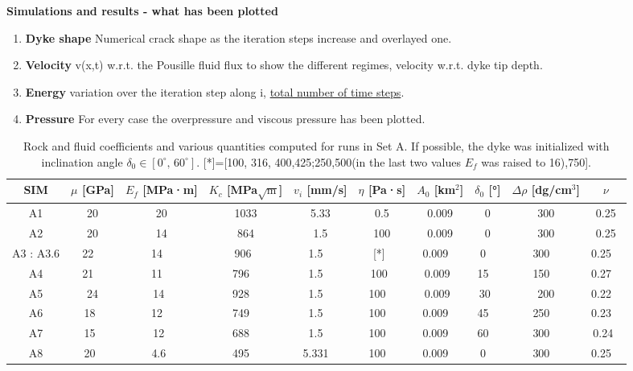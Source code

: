 \documentclass[9pt]{beamer}
\newcommand\Fontsm{\fontsize{4}{5}\selectfont}
\newcommand\Fonttab{\fontsize{12}{7.2}\selectfont}
\begin{document}
\begin{frame}[allowframebreaks]{\textbf{Simulations and results - what has been plotted}}
\Fonttab
\begin{enumerate}
\item \textbf{Dyke shape} Numerical crack shape as the iteration steps increase and overlayed one.
\item \textbf{Velocity} v(x,t) w.r.t. the Pousille fluid flux to show the different regimes, velocity w.r.t. dyke tip depth.
\item \textbf{Energy} variation over the iteration step along i, \underline{total number of time steps}.
\item \textbf{Pressure} For every case the overpressure and viscous pressure has been plotted.
\end{enumerate}
\Fontsm
\begin{table}[h]
    \centering
    \begin{tabular}{|c|c|c|c|c|c|c|c|c|c|}
    \hline
        \textbf{SIM} & \textbf{$\mu$ [GPa]} & \textbf{$E_f$ [MPa·m]} & \textbf{$K_c$ [MPa$\sqrt{\text{m}}$]} & \textbf{$v_i$ [mm/s]} & \textbf{$\eta$ [Pa·s]} & \textbf{$A_0$ [km$^2$]} & \textbf{$\delta_0$ [°]} & \textbf{$\Delta \rho$ [dg/cm$^3$]} & \textbf{$\nu$} \\
    \hline
        A1 &20 &20 &1033 &5.33 &0.5 &0.009 & 0 &300 & 0.25 \\ \hline
        A2 &20 &14 &864  &1.5  &100 &0.009 & 0 &300 & 0.25 \\ \hline
        A3 : A3.6 &22 ~ &14 ~ & 906~ &1.5 ~ & [*]~ &0.009 ~ &0 ~ &300 ~ &0.25 ~ \\ \hline
        A4 &21 ~ &11 ~ &796 ~ &1.5 ~ & 100~ & 0.009~ &15 ~ &150 ~ &0.27 ~ \\ \hline
        A5 &24 &14~ &928 ~ &1.5 ~ &100 ~ &0.009~ &30~ &200&0.22 ~ \\ \hline
        A6 &18~ &12 ~ &749 ~ &1.5 ~ &100 ~ &0.009 ~ &45 ~ &250 ~ &0.23 ~ \\ \hline
        A7 &15~ &12~ &688 ~ &1.5 ~ &100 ~ &0.009 ~ &60 ~ &300 ~ & 0.24~ \\ \hline
        A8 &20~ &4.6~ &495 ~ &5.331 ~ &100 ~ &0.009 ~ &0 ~ &300 ~ &0.25 ~ \\ \hline
    \end{tabular}
    \caption{Rock and fluid coefficients and various quantities computed for runs in Set A. If possible, the dyke was initialized with inclination angle $\delta_0 \in [0^\circ,\,60^\circ]$. [*]=[100, 316, 400,425;250,500(in the last two values $E_f$ was raised to 16),750].}

\end{table}
\end{frame}
\end{document}
